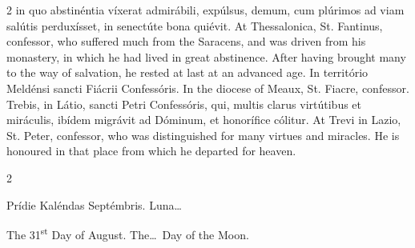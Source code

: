 \begin{paracol}{2}
 in quo abstinéntia víxerat admirábili, expúlsus, demum, cum plúrimos ad viam 
 salútis perduxísset, in senectúte bona quiévit.
\switchcolumn
{}
At Thessalonica, St. Fantinus, 
 confessor, who suffered much from the Saracens, and was driven from his 
 monastery, in which he had lived in great abstinence. After having 
 brought many to the way of salvation, he rested at last at an advanced age.
\switchcolumn*
{}
In território Meldénsi 
 sancti Fiácrii Confessóris.
\switchcolumn
{}
In the diocese of Meaux, St. Fiacre, 
 confessor.
\switchcolumn*
{}
Trebis, in Látio, 
 sancti Petri Confessóris, qui, multis clarus virtútibus et miráculis, ibídem 
 migrávit ad Dóminum, et honorífice cólitur.
\switchcolumn
{}
At Trevi in Lazio, St. Peter, 
 confessor, who was distinguished for many virtues and miracles. He is 
 honoured in that place from which he departed for heaven.
\switchcolumn*
{}
\end{paracol}


\begin{paracol}{2}
\begin{center}{\color{gregoriocolor} Prídie Kaléndas Septémbris. 
 Luna\dots\ }\end{center}
\switchcolumn
{}
\begin{center}{\color{gregoriocolor} The 
 31\textsuperscript{st} Day of 
 August. The\dots\ Day of the Moon.}\end{center}
\end{paracol}

